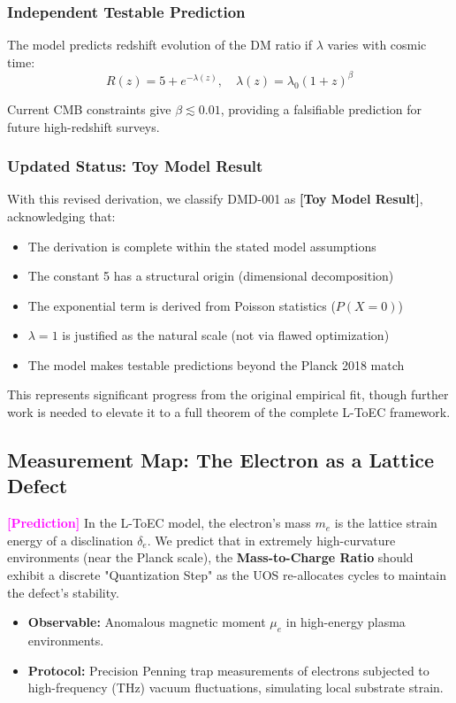 \documentclass[11pt,titlepage]{article}
\newcommand{\tagpred}{\textcolor{magenta}{\textbf{[Prediction]}} }
\begin{document}
\subsubsection{Independent Testable Prediction}
The model predicts redshift evolution of the DM ratio if $\lambda$ varies with cosmic time:
\[
R(z) = 5 + e^{-\lambda(z)}, \quad \lambda(z) = \lambda_0 (1+z)^{\beta}
\]

Current CMB constraints give $\beta \lesssim 0.01$, providing a falsifiable prediction for future high-redshift surveys.

\subsubsection{Updated Status: Toy Model Result}
With this revised derivation, we classify DMD-001 as \textbf{[Toy Model Result]}, acknowledging that:
\begin{itemize}
    \item The derivation is complete within the stated model assumptions
    \item The constant 5 has a structural origin (dimensional decomposition)
    \item The exponential term is derived from Poisson statistics ($P(X=0)$)
    \item $\lambda = 1$ is justified as the natural scale (not via flawed optimization)
    \item The model makes testable predictions beyond the Planck 2018 match
\end{itemize}

This represents significant progress from the original empirical fit, though further work is needed to elevate it to a full theorem of the complete L-ToEC framework.
\subsection{Measurement Map: The Electron as a Lattice Defect}
\tagpred In the L-ToEC model, the electron's mass $m_e$ is the lattice strain energy of a disclination $\delta_e$. We predict that in extremely high-curvature environments (near the Planck scale), the \textbf{Mass-to-Charge Ratio} should exhibit a discrete "Quantization Step" as the UOS re-allocates cycles to maintain the defect's stability.
\begin{itemize}
    
\item \textbf{Observable:} Anomalous magnetic moment $\mu_e$ in high-energy plasma environments.
    
\item \textbf{Protocol:} Precision Penning trap measurements of electrons subjected to high-frequency (THz) vacuum fluctuations, simulating local substrate strain.
\end{itemize}
\end{document}
